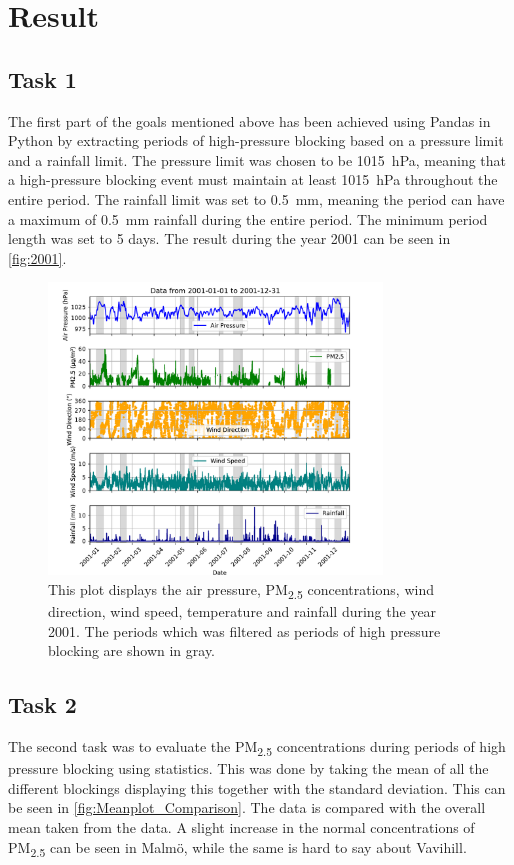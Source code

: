 \section{Result}

\subsection{Task 1 }
The first part of the goals mentioned above has been achieved using Pandas in Python by extracting periods of high-pressure blocking based on a pressure limit and a rainfall limit. The pressure limit was chosen to be \SI{1015}{\hecto\pascal}, meaning that a high-pressure blocking event must maintain at least \SI{1015}{\hecto\pascal} throughout the entire period. The rainfall limit was set to \SI{0.5}{\milli\meter}, meaning the period can have a maximum of \SI{0.5}{\milli\meter} rainfall during the entire period. The minimum period length was set to 5 days. The result during the year 2001 can be seen in \autoref{fig:2001}.

\begin{figure}[H]
    \centering    \includegraphics[width=0.79\textwidth]{Figures/plot_20010101_20011231.pdf}
    \caption{This plot displays the air pressure, PM\textsubscript{2.5} concentrations, wind direction, wind speed, temperature and rainfall during the year 2001. The periods which was filtered as periods of high pressure blocking are shown in gray. }
    \label{fig:2001}
\end{figure}

\subsection{Task 2}
The second task was to evaluate the PM\textsubscript{2.5} concentrations during periods of high pressure blocking using statistics. This was done by taking the mean of all the different blockings displaying this together with the standard deviation. This can be seen in \autoref{fig:Meanplot_Comparison}. The data is compared with the overall mean taken from the data. A slight increase in the normal concentrations of PM\textsubscript{2.5} can be seen in Malmö, while the same is hard to say about Vavihill. 






